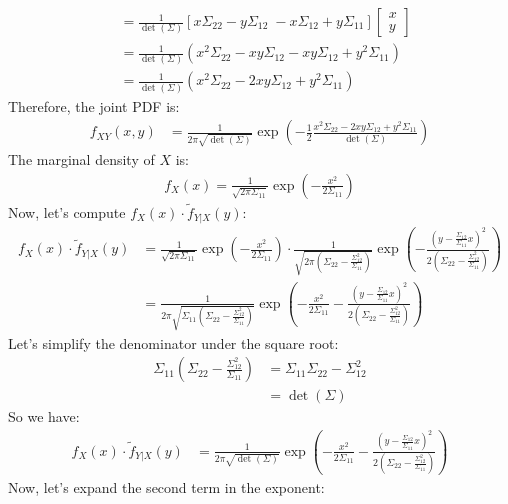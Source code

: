 \documentclass{article}
\begin{document}
\begin{enumerate}
{\begin{align}
&= \frac{1}{\det(\Sigma)}[x\Sigma_{22} - y\Sigma_{12} \; -x\Sigma_{12} + y\Sigma_{11}]\begin{bmatrix} x \\ y \end{bmatrix}\\
&= \frac{1}{\det(\Sigma)}(x^2\Sigma_{22} - xy\Sigma_{12} - xy\Sigma_{12} + y^2\Sigma_{11})\\
&= \frac{1}{\det(\Sigma)}(x^2\Sigma_{22} - 2xy\Sigma_{12} + y^2\Sigma_{11})
\end{align}
Therefore, the joint PDF is:
\begin{align}
f_{XY}(x,y) &= \frac{1}{2\pi\sqrt{\det(\Sigma)}}\exp\left(-\frac{1}{2}\frac{x^2\Sigma_{22} - 2xy\Sigma_{12} + y^2\Sigma_{11}}{\det(\Sigma)}\right)
\end{align}
The marginal density of $X$ is:
\begin{align}
f_X(x) = \frac{1}{\sqrt{2\pi\Sigma_{11}}}\exp\left(-\frac{x^2}{2\Sigma_{11}}\right)
\end{align}
Now, let's compute $f_X(x) \cdot \tilde{f}_{Y|X}(y)$:
\begin{align}
f_X(x) \cdot \tilde{f}_{Y|X}(y) &= \frac{1}{\sqrt{2\pi\Sigma_{11}}}\exp\left(-\frac{x^2}{2\Sigma_{11}}\right) \cdot \frac{1}{\sqrt{2\pi\left(\Sigma_{22} - \frac{\Sigma_{12}^2}{\Sigma_{11}}\right)}} \exp\left(-\frac{(y-\frac{\Sigma_{12}}{\Sigma_{11}}x)^2}{2\left(\Sigma_{22} - \frac{\Sigma_{12}^2}{\Sigma_{11}}\right)}\right)\\
&= \frac{1}{2\pi\sqrt{\Sigma_{11}\left(\Sigma_{22} - \frac{\Sigma_{12}^2}{\Sigma_{11}}\right)}}\exp\left(-\frac{x^2}{2\Sigma_{11}} - \frac{(y-\frac{\Sigma_{12}}{\Sigma_{11}}x)^2}{2\left(\Sigma_{22} - \frac{\Sigma_{12}^2}{\Sigma_{11}}\right)}\right)
\end{align}
Let's simplify the denominator under the square root:
\begin{align}
\Sigma_{11}\left(\Sigma_{22} - \frac{\Sigma_{12}^2}{\Sigma_{11}}\right) &= \Sigma_{11}\Sigma_{22} - \Sigma_{12}^2\\
&= \det(\Sigma)
\end{align}
So we have:
\begin{align}
f_X(x) \cdot \tilde{f}_{Y|X}(y) &= \frac{1}{2\pi\sqrt{\det(\Sigma)}}\exp\left(-\frac{x^2}{2\Sigma_{11}} - \frac{(y-\frac{\Sigma_{12}}{\Sigma_{11}}x)^2}{2\left(\Sigma_{22} - \frac{\Sigma_{12}^2}{\Sigma_{11}}\right)}\right)
\end{align}
Now, let's expand the second term in the exponent:
\begin{align}

\end{align}}
\end{enumerate}
\end{document}
